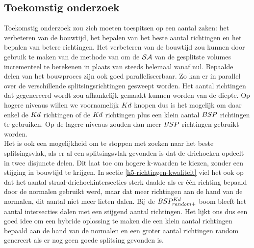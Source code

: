 \subsection{Toekomstig onderzoek}
Toekomstig onderzoek zou zich moeten toespitsen op een aantal zaken: het verbeteren van de bouwtijd, het bepalen van het beste aantal richtingen en het bepalen van betere richtingen.
Het verbeteren van de bouwtijd zou kunnen door gebruik te maken van de methode van \authorBudge{} \cite{Budge} om de $\mathcal{SA}$ van de gesplitste volumes incrementeel te berekenen in plaats van steeds helemaal vanaf nul.
Bepaalde delen van het bouwproces zijn ook goed paralleliseerbaar. 
Zo kan er in parallel over de verschillende splitsingsrichtingen gesweept worden.
Het aantal richtingen dat gegenereerd wordt zou afhankelijk gemaakt kunnen worden van de diepte.
Op hogere niveaus willen we voornamelijk $Kd$ knopen dus is het mogelijk om daar enkel de $Kd$ richtingen of de $Kd$ richtingen plus een klein aantal $BSP$ richtingen te gebruiken. Op de lagere niveaus zouden dan meer $BSP$ richtingen gebruikt worden.\\

Het is ook een mogelijkheid om te stoppen met zoeken naar het beste splitsingsvlak, als er al een splitsingsvlak gevonden is dat de driehoeken opdeelt in twee disjuncte delen.
Dit laat toe om hogere k-waarden te kiezen, zonder een stijging in bouwtijd te krijgen.
In sectie \ref{h5-richtingen-kwaliteit} viel het ook op dat het aantal straal-driehoekintersecties sterk daalde als er één richting bepaald door de normalen gebruikt werd, maar dat meer richtingen aan de hand van de normalen, dit aantal niet meer lieten dalen.
Bij de $BSP^{Kd}_{random+}$ boom bleeft het aantal intersecties dalen met een stijgend aantal richtingen.
Het lijkt ons dus een goed idee om een hybride oplossing te maken die een klein aantal richtingen bepaald aan de hand van de normalen en een groter aantal richtingen random genereert als er nog geen goede splitsing gevonden is.

